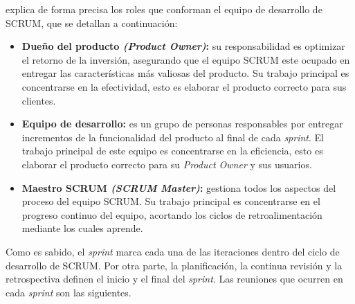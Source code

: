 \cite{Hundermark} explica de forma precisa los roles que conforman el equipo de desarrollo de SCRUM, que se detallan a continuaci\'{o}n:
			
		\begin{itemize}
				
				\item \textbf{Due\~{n}o del producto \textit{(Product Owner)}:} su responsabilidad es optimizar el retorno de la inversi\'{o}n, asegurando que el equipo SCRUM este ocupado en entregar las caracter\'{i}sticas m\'{a}s valiosas del producto. Su trabajo principal es concentrarse en la efectividad, esto es elaborar el producto correcto para sus clientes.
				
				\item \textbf{Equipo de desarrollo:} es un grupo de personas responsables por entregar incrementos de la funcionalidad del producto al final de cada \textit{sprint}. El trabajo principal de este equipo es concentrarse en la eficiencia, esto es elaborar el producto correcto para su \textit{Product Owner} y sus usuarios.
				
				\item \textbf{Maestro SCRUM \textit{(SCRUM Master)}:} gestiona todos los aspectos del proceso del equipo SCRUM. Su trabajo principal es concentrarse en el progreso continuo del equipo, acortando los ciclos de retroalimentaci\'{o}n mediante los cuales aprende.
				
		\end{itemize}
			
			Como es sabido, el \textit{sprint} marca cada una de las iteraciones dentro del ciclo de desarrollo de SCRUM. Por otra parte, la planificaci\'{o}n, la continua revisi\'{o}n y la retrospectiva definen el inicio y el final del \textit{sprint}. Las reuniones que ocurren en cada \textit{sprint} son las siguientes.
			
